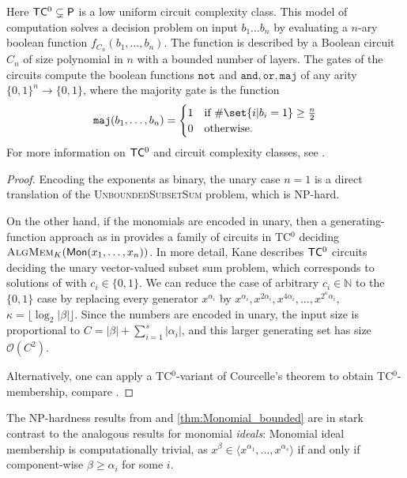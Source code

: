 \documentclass[12pt]{article}
\newcommand{\NN}{\mathbb{N}}
\newcommand{\Landau}{\mathcal{O}}
\newcommand{\pclass}[1]{\textsf{\textup{#1}}}
\newcommand{\Mon}{\pclass{Mon}}
\newcommand{\problemText}[1]{\textsc{#1}\xspace}
\newcommand{\AlgMem}{\problemText{AlgMem}}
\newcommand{\SubsetSum}{\problemText{UnboundedSubsetSum}}
\newcommand{\cclass}[1]{\textsf{\textup{#1}}\xspace}
\newcommand{\TCO}{\cclass{TC\ensuremath{^0}}}
\newcommand{\DP}{\cclass{P}}
\newcommand{\NP}{\cclass{NP}}
\begin{document}
Here $\TCO \subsetneq \DP$ is a low uniform circuit complexity class. This model of computation solves a decision problem on input $b_1\dots b_n$ by evaluating a $n$-ary boolean function $f_{C_n}(b_1,\dots,b_n)$. The function is described by a Boolean circuit $C_n$ of size polynomial in $n$ with a bounded number of layers. The gates of the circuits compute the boolean functions $\texttt{not}$ and $\texttt{and},\texttt{or},\texttt{maj}$ of any arity $\{0,1\}^n\to\{0,1\}$, where the majority gate is the function
\[
\texttt{maj}(b_1,\dots,b_n) = \begin{cases}
    1 & \text{if } \#\set{i|b_i=1} \geq \frac{n}{2} \\
    0 & \text{otherwise.}
\end{cases}
\]
For more information on $\TCO$ and circuit complexity classes, see \cite[Chapter 4]{Vollmer1999}.

\begin{proof}
Encoding the exponents as binary, the unary case $n=1$ is a direct translation of the \SubsetSum problem, which is \NP-hard.

On the other hand, if the monomials are encoded in unary, then a generating-function approach as in \cite{Kane2017}  provides a family of circuits in \TCO deciding $\AlgMem_K(\Mon(x_1,\dots,x_n))$. In more detail, Kane describes $\TCO$ circuits deciding the unary vector-valued subset sum problem, which corresponds to solutions of  with $c_i \in \{0,1\}$. We can reduce the case of arbitrary $c_i \in \NN$ to the $\{0,1\}$ case by replacing every generator $x^{\alpha_i}$ by $x^{\alpha_i},x^{2\alpha_i},x^{4\alpha_i},\dots,x^{2^\kappa \alpha_i}$, $\kappa = \lfloor \log_2 |\beta| \rfloor$. Since the numbers are encoded in unary, the input size is proportional to $C=|\beta|+\sum_{i=1}^s |\alpha_i|$, and this larger generating set has size $\Landau(C^2)$.

Alternatively, one can apply a \TCO-variant of Courcelle’s theorem to obtain \TCO-membership, compare \cite[Theorem 13]{Elberfeld2012}.
\end{proof}

\begin{remark}
The \NP-hardness results from  and \ref{thm:Monomial_bounded} are in stark contrast to the analogous results for monomial \emph{ideals}: Monomial ideal membership is computationally trivial, as $x^\beta \in \langle x^{\alpha_1},\dots,x^{\alpha_s} \rangle$ if and only if component-wise $\beta \geq \alpha_i$ for some $i$.
\end{remark}
\end{document}
